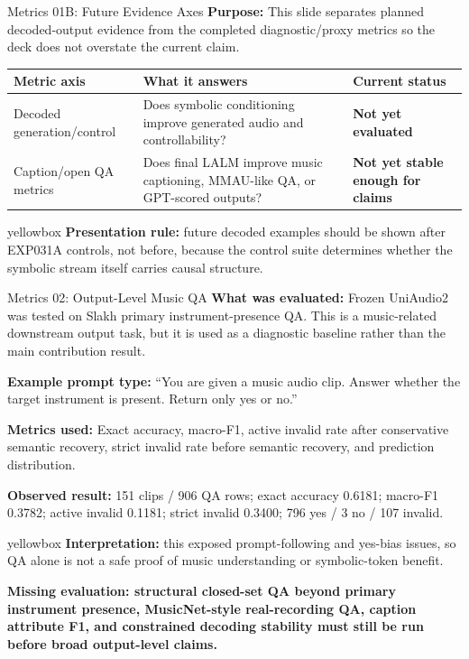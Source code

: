 \documentclass[aspectratio=169,11pt]{beamer}
\newcommand{\missing}[1]{{\color{missingred}\textbf{#1}}}
\newcommand{\expfield}[2]{\textbf{#1:} #2\par\vspace{0.10cm}}
\newenvironment{keybox}{%
  \begin{beamercolorbox}[rounded=true,sep=0.14cm,wd=\linewidth]{yellowbox}\footnotesize%
}{%
  \end{beamercolorbox}%
}
\begin{document}
\begin{frame}{Metrics 01B: Future Evidence Axes}
  \footnotesize
  \expfield{Purpose}{This slide separates planned decoded-output evidence from the completed diagnostic/proxy metrics so the deck does not overstate the current claim.}

  \begin{tabularx}{\linewidth}{p{2.8cm}Yp{3.0cm}}
    \toprule
    Metric axis & What it answers & Current status \\
    \midrule
    Decoded generation/control & Does symbolic conditioning improve generated audio and controllability? & \missing{Not yet evaluated} \\
    Caption/open QA metrics & Does final LALM improve music captioning, MMAU-like QA, or GPT-scored outputs? & \missing{Not yet stable enough for claims} \\
    \bottomrule
  \end{tabularx}

  \vspace{0.2cm}
  \begin{keybox}\textbf{Presentation rule:} future decoded examples should be shown after EXP031A controls, not before, because the control suite determines whether the symbolic stream itself carries causal structure.\end{keybox}
\end{frame}

\begin{frame}{Metrics 02: Output-Level Music QA}
  \footnotesize
  \expfield{What was evaluated}{Frozen UniAudio2 was tested on Slakh primary instrument-presence QA. This is a music-related downstream output task, but it is used as a diagnostic baseline rather than the main contribution result.}
  \expfield{Example prompt type}{``You are given a music audio clip. Answer whether the target instrument is present. Return only yes or no.''}
  \expfield{Metrics used}{Exact accuracy, macro-F1, active invalid rate after conservative semantic recovery, strict invalid rate before semantic recovery, and prediction distribution.}
  \expfield{Observed result}{151 clips / 906 QA rows; exact accuracy 0.6181; macro-F1 0.3782; active invalid 0.1181; strict invalid 0.3400; 796 yes / 3 no / 107 invalid.}

  \begin{keybox}\textbf{Interpretation:} this exposed prompt-following and yes-bias issues, so QA alone is not a safe proof of music understanding or symbolic-token benefit.\end{keybox}
  \vspace{0.18cm}
  \missing{Missing evaluation: structural closed-set QA beyond primary instrument presence, MusicNet-style real-recording QA, caption attribute F1, and constrained decoding stability must still be run before broad output-level claims.}
\end{frame}
\end{document}
